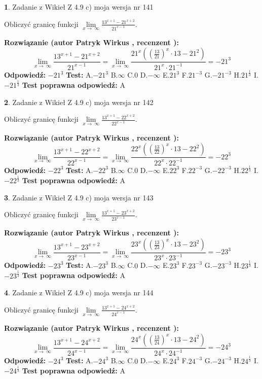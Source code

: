 \documentclass[12pt, a4paper]{article}
\theoremstyle{definition} %
\newtheorem{zad}{}
\newcommand{\zadStart}[1]{\begin{zad}#1\newline}
\newcommand{\zadStop}{\end{zad}}
\newcommand{\rozwStart}[2]{\noindent \textbf{Rozwiązanie (autor #1 , recenzent #2): }\newline}
\newcommand{\rozwStop}{\newline}
\newcommand{\odpStart}{\noindent \textbf{Odpowiedź:}\newline}
\newcommand{\odpStop}{\newline}
\newcommand{\testStart}{\noindent \textbf{Test:}\newline}
\newcommand{\testStop}{\newline}
\newcommand{\kluczStart}{\noindent \textbf{Test poprawna odpowiedź:}\newline}
\newcommand{\kluczStop}{\newline}
\begin{document}
\zadStart{Zadanie z Wikieł Z 4.9 c) moja wersja nr 141}


Obliczyć granicę funkcji  $\lim\limits_{x\to\ \infty}\frac{13^{x+1}-21^{x+2}}{21^{x-1}}$.
\zadStop
\rozwStart{Patryk Wirkus}{}
$$\lim\limits_{x\to\ \infty}\frac{13^{x+1}-21^{x+2}}{21^{x-1}}=\lim\limits_{x\to\ \infty}\frac{21^{x}((\frac{13}{21})^{x}\cdot 13 -21^{2})}{21^{x}\cdot 21^{-1}} = -21^{3}$$
\rozwStop
\odpStart
$-21^{3}$
\odpStop
\testStart
A.$-21^{3}$ B.$\infty$ C.$0$ D.$-\infty$ E.$21^{3}$
F.$21^{-3}$ G.$-21^{-3}$
H.$21^{\frac{1}{3}}$
I.$-21^{\frac{1}{3}}$
\testStop
\kluczStart
A
\kluczStop



\zadStart{Zadanie z Wikieł Z 4.9 c) moja wersja nr 142}


Obliczyć granicę funkcji  $\lim\limits_{x\to\ \infty}\frac{13^{x+1}-22^{x+2}}{22^{x-1}}$.
\zadStop
\rozwStart{Patryk Wirkus}{}
$$\lim\limits_{x\to\ \infty}\frac{13^{x+1}-22^{x+2}}{22^{x-1}}=\lim\limits_{x\to\ \infty}\frac{22^{x}((\frac{13}{22})^{x}\cdot 13 -22^{2})}{22^{x}\cdot 22^{-1}} = -22^{3}$$
\rozwStop
\odpStart
$-22^{3}$
\odpStop
\testStart
A.$-22^{3}$ B.$\infty$ C.$0$ D.$-\infty$ E.$22^{3}$
F.$22^{-3}$ G.$-22^{-3}$
H.$22^{\frac{1}{3}}$
I.$-22^{\frac{1}{3}}$
\testStop
\kluczStart
A
\kluczStop



\zadStart{Zadanie z Wikieł Z 4.9 c) moja wersja nr 143}


Obliczyć granicę funkcji  $\lim\limits_{x\to\ \infty}\frac{13^{x+1}-23^{x+2}}{23^{x-1}}$.
\zadStop
\rozwStart{Patryk Wirkus}{}
$$\lim\limits_{x\to\ \infty}\frac{13^{x+1}-23^{x+2}}{23^{x-1}}=\lim\limits_{x\to\ \infty}\frac{23^{x}((\frac{13}{23})^{x}\cdot 13 -23^{2})}{23^{x}\cdot 23^{-1}} = -23^{3}$$
\rozwStop
\odpStart
$-23^{3}$
\odpStop
\testStart
A.$-23^{3}$ B.$\infty$ C.$0$ D.$-\infty$ E.$23^{3}$
F.$23^{-3}$ G.$-23^{-3}$
H.$23^{\frac{1}{3}}$
I.$-23^{\frac{1}{3}}$
\testStop
\kluczStart
A
\kluczStop



\zadStart{Zadanie z Wikieł Z 4.9 c) moja wersja nr 144}


Obliczyć granicę funkcji  $\lim\limits_{x\to\ \infty}\frac{13^{x+1}-24^{x+2}}{24^{x-1}}$.
\zadStop
\rozwStart{Patryk Wirkus}{}
$$\lim\limits_{x\to\ \infty}\frac{13^{x+1}-24^{x+2}}{24^{x-1}}=\lim\limits_{x\to\ \infty}\frac{24^{x}((\frac{13}{24})^{x}\cdot 13 -24^{2})}{24^{x}\cdot 24^{-1}} = -24^{3}$$
\rozwStop
\odpStart
$-24^{3}$
\odpStop
\testStart
A.$-24^{3}$ B.$\infty$ C.$0$ D.$-\infty$ E.$24^{3}$
F.$24^{-3}$ G.$-24^{-3}$
H.$24^{\frac{1}{3}}$
I.$-24^{\frac{1}{3}}$
\testStop
\kluczStart
A
\kluczStop
\end{document}
